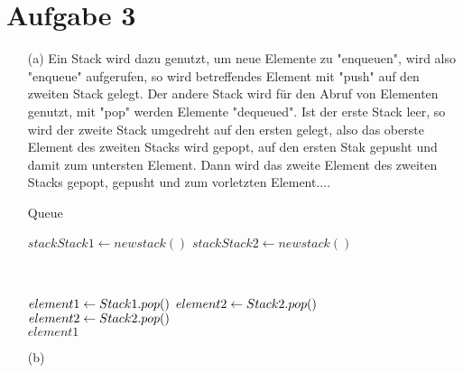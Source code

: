 \documentclass{scrartcl}
\begin{document}
\section{Aufgabe 3}
\begin{enumerate}
\item[(a)]
Ein Stack wird dazu genutzt, um neue Elemente zu "enqueuen", wird 
also "enqueue" aufgerufen, so wird betreffendes Element mit "push" 
auf den zweiten Stack gelegt. Der andere Stack wird für den Abruf 
von Elementen genutzt, mit "pop" werden Elemente "dequeued". Ist der 
erste Stack leer, so wird der zweite Stack umgedreht auf den ersten 
gelegt, also das oberste Element des zweiten Stacks wird gepopt, 
auf den ersten Stak gepusht und damit zum untersten Element. Dann 
wird das zweite Element des zweiten Stacks gepopt, gepusht und zum 
vorletzten Element....

\begin{algorithm}
\caption{Queue}
\begin{algorithmic}[1]
\State $stack Stack1 \gets new stack()$
\State $stack Stack2 \gets new stack()$

 \\
\EndFunction

\State $element1 \gets \Call{$Stack1.pop$}$
\State	$element2 \gets \Call{$Stack2.pop$}$
		\State $element2 \gets \Call{$Stack2.pop$}$
	\EndWhile
\Else \\
	\Return $element1$
\EndIf
\EndFunction
\end{algorithmic}
\end{algorithm}
\item[(b)]
\end{enumerate}
\end{document}
